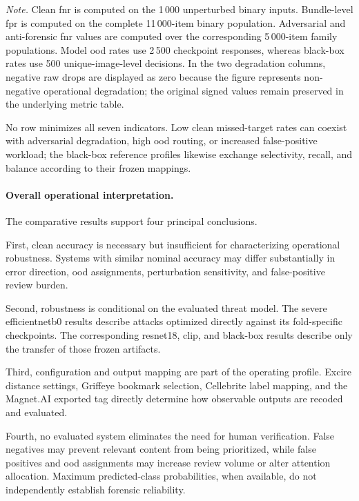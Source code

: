 \begin{flushleft}
\footnotesize
\textit{Note.} Clean \acrshort{fnr} is computed on the 1\,000 unperturbed
binary inputs. Bundle-level \acrshort{fpr} is computed on the complete
11\,000-item binary population. Adversarial and anti-forensic \acrshort{fnr}
values are computed over the corresponding 5\,000-item family populations.
Model \acrshort{ood} rates use 2\,500 checkpoint responses, whereas black-box
rates use 500 unique-image-level decisions. In the two degradation columns,
negative raw drops are displayed as zero because the figure represents
non-negative operational degradation; the original signed values remain
preserved in the underlying metric table.
\end{flushleft}

No row minimizes all seven indicators. Low clean missed-target rates can
coexist with adversarial degradation, high \gls{ood} routing, or increased
false-positive workload; the black-box reference profiles likewise exchange
selectivity, recall, and balance according to their frozen mappings.

\paragraph{Overall operational interpretation.}

The comparative results support four principal conclusions.

First, clean accuracy is necessary but insufficient for characterizing
operational robustness. Systems with similar nominal accuracy may differ
substantially in error direction, \gls{ood} assignments, perturbation
sensitivity, and false-positive review burden.

Second, robustness is conditional on the evaluated threat model. The severe
\gls{efficientnetb0} results describe attacks optimized directly against its
fold-specific checkpoints. The corresponding \gls{resnet18}, \gls{clip}, and
black-box results describe only the transfer of those frozen artifacts.

Third, configuration and output mapping are part of the operating profile.
Excire distance settings, Griffeye bookmark selection, Cellebrite label mapping,
and the Magnet.AI exported tag directly determine how observable outputs are
recoded and evaluated.

Fourth, no evaluated system eliminates the need for human verification. False
negatives may prevent relevant content from being prioritized, while false
positives and \gls{ood} assignments may increase review volume or alter
attention allocation. Maximum predicted-class probabilities, when available,
do not independently establish forensic reliability.

